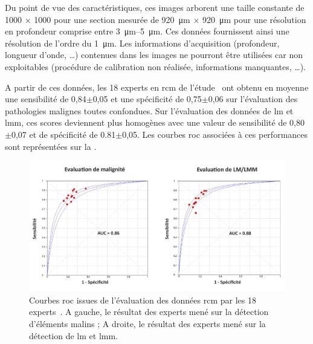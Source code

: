 Du point de vue des caractéristiques, ces images arborent une taille constante de \SI{1000}{\px} $\times$ \SI{1000}{\px} pour une section mesurée de \SI{920}{\micro\metre} $\times$ \SI{920}{\micro\metre} pour une résolution en profondeur comprise entre \SIrange{3}{5}{\micro\metre}. Ces données fournissent ainsi une résolution de l'ordre du \SI{1}{\micro\metre}. Les informations d'acquisition (profondeur, longueur d'onde, \ldots) contenues dans les images ne pourront être utilisées car non exploitables (procédure de calibration non réalisée, informations manquantes, \ldots).\par
\clearpage

A partir de ces données, les 18 experts en \gls{rcm} de l'étude~\cite{Cinotti2018} ont obtenu en moyenne une sensibilité de 0,84$\pm$0,05 et une spécificité de 0,75$\pm$0,06 sur l'évaluation des pathologies malignes toutes confondues. Sur l'évaluation des données de \gls{lm} et \gls{lmm}, ces scores deviennent plus homogènes avec une valeur de sensibilité de 0,80$\pm$0,07 et de spécificité de 0.81$\pm$0,05. Les courbes \gls{roc} associées à ces performances sont représentées sur la .\par

\begin{figure}[H]
    \begin{center}
        \includegraphics[width=\linewidth]{contents/ii_preamble_microscopy/resources/results_roc_rcm_experts.pdf}
        \caption{Courbes \gls{roc} issues de l'évaluation des données \gls{rcm} par les 18 experts~\cite{Cinotti2018}. A gauche, le résultat des experts mené sur la détection d'éléments malins ; A droite, le résultat des experts mené sur la détection de \gls{lm} et \gls{lmm}.}
        \label{fig:results_roc_rcm_experts}
    \end{center} 
\end{figure}\par

